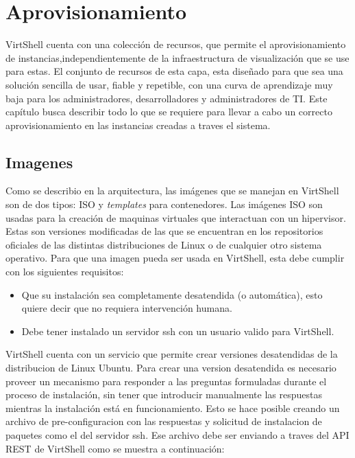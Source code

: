 \chapter{Aprovisionamiento}
\label{capaprovisionamiento}

VirtShell cuenta con una colección de recursos, que permite el aprovisionamiento de instancias,independientemente de la infraestructura de visualización que se use para estas. El conjunto de recursos de esta capa, esta diseñado para que sea una solución sencilla de usar, fiable y repetible, con una curva de aprendizaje muy baja para los administradores, desarrolladores y administradores de TI. Este capítulo busca describir todo lo que se requiere para llevar a cabo un correcto aprovisionamiento en las instancias creadas a traves el sistema.

\section{Imagenes}
Como se describio en la arquitectura, las imágenes que se manejan en VirtShell son de dos tipos: ISO y \emph{templates} para contenedores. Las imágenes ISO son usadas para la creación de maquinas virtuales que interactuan con un hipervisor. Estas son versiones modificadas de las que se encuentran en los repositorios oficiales de las distintas distribuciones de Linux o de cualquier otro sistema operativo. Para que una imagen pueda ser usada en VirtShell, esta debe cumplir con los siguientes requisitos: 
\begin{itemize}
\item Que su instalación sea completamente desatendida (o automática), esto quiere decir que no requiera intervención humana.
\item Debe tener instalado un servidor ssh con un usuario valido para VirtShell.
\end{itemize}

VirtShell cuenta con un servicio que permite crear versiones desatendidas de la distribucion de Linux Ubuntu. Para crear una version desatendida es necesario proveer un mecanismo para responder a las preguntas formuladas durante el proceso de instalación, sin tener que introducir manualmente las respuestas mientras la instalación está en funcionamiento. Esto se hace posible creando un archivo de pre-configuracion con las respuestas y solicitud de instalacion de paquetes como el del servidor ssh. Ese archivo debe ser enviando a traves del API REST de VirtShell como se muestra a continuación:

